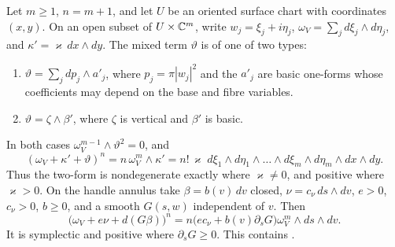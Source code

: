 \begin{lemma}\label{lem:pre-top-power}
Let $m\ge1$, $n=m+1$, and let $U$ be an oriented surface chart with coordinates $(x,y)$.
On an open subset of $U\times\mathbb{C}^m$, write $w_j=\xi_j+i\eta_j$,
$\omega_V=\sum_jd\xi_j\wedge d\eta_j$, and $\kappa'=\varkappa\,dx\wedge dy$.
The mixed term $\vartheta$ is of one of two types:
\begin{enumerate}[label=(\alph*)]
\item $\vartheta=\sum_jdp_j\wedge a'_j$, where $p_j=\pi|w_j|^2$ and the $a'_j$ are basic one-forms
 whose coefficients may depend on the base and fibre variables.
\item $\vartheta=\zeta\wedge\beta'$, where $\zeta$ is vertical and $\beta'$ is basic.
\end{enumerate}
In both cases $\omega_V^{m-1}\wedge\vartheta^2=0$, and
\[
 (\omega_V+\kappa'+\vartheta)^n
 =n\,\omega_V^m\wedge\kappa'
 =n!\,\varkappa\;d\xi_1\wedge d\eta_1\wedge\dots\wedge d\xi_m\wedge d\eta_m\wedge dx\wedge dy.
\]
Thus the two-form is nondegenerate exactly where $\varkappa\ne0$, and positive where $\varkappa>0$.
On the handle annulus take $\beta=b(v)\,dv$ closed, $\nu=c_\nu\,ds\wedge dv$,
$e>0$, $c_\nu>0$, $b\ge0$, and a smooth $G(s,w)$ independent of $v$. Then
\[
 \big(\omega_V+e\nu+d(G\beta)\big)^n
 =n\big(e c_\nu+b(v)\partial_sG\big)\omega_V^m\wedge ds\wedge dv.
\]
It is symplectic and positive where $\partial_sG\ge0$.
This contains .
\end{lemma}

